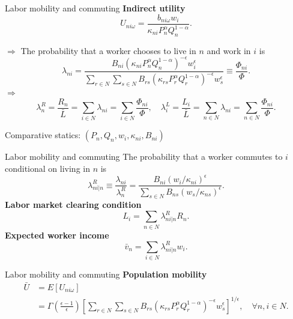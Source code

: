 \documentclass{beamer}
\begin{document}
\begin{frame}{Labor mobility and commuting}
	\textbf{Indirect utility}
	\begin{equation}
		U_{ni\omega} = \frac{b_{ni\omega}w_i}{\kappa_{ni}P_n^\alpha Q_n^{1-\alpha}}.
	\end{equation}
	\medskip

	$\Rightarrow$ The probability that a worker chooses to live in $n$ and work in $i$ is
	\begin{equation}
		\lambda_{ni} = \frac{B_{ni}\left(\kappa_{ni}P_n^\alpha Q_n^{1-\alpha}\right)^{-\epsilon}w_i^{\epsilon}}{\sum_{r\in N}\sum_{s\in N}B_{rs}\left(\kappa_{rs}P_r^\alpha Q_r^{1-\alpha}\right)^{-\epsilon}w_s^{\epsilon}}\equiv \frac{\Phi_{ni}}{\Phi}.
	\end{equation}
	$\Rightarrow$
	\begin{equation}
		\lambda_n^R = \frac{R_n}{\bar{L}}=\sum_{i\in N}\lambda_{ni}=\sum_{i\in N}\frac{\Phi_{ni}}{\Phi},\quad \lambda_i^L = \frac{L_i}{\bar{L}}=\sum_{n\in N}\lambda_{ni}=\sum_{n\in N}\frac{\Phi_{ni}}{\Phi}.
	\end{equation}
	\begin{block}{}
		Comparative statics: $(P_n, Q_n, w_i, \kappa_{ni}, B_{ni})$
	\end{block}
\end{frame}
\begin{frame}{Labor mobility and commuting}
	The probability that a worker commutes to $i$ conditional on living in $n$ is
	\begin{equation}
		\lambda_{ni|n}^R \equiv \frac{\lambda_{ni}}{\lambda_n^R} = \frac{B_{ni}(w_i/\kappa_{ni})^{\epsilon}}{\sum_{s\in N}B_{ns}(w_s/\kappa_{ns})^{\epsilon}}.
	\end{equation}
	\textbf{Labor market clearing condition}
	\begin{equation}
		L_i = \sum_{n\in N}\lambda_{ni|n}^R R_n.
	\end{equation}
	\textbf{Expected worker income}
	\begin{equation}
		\bar{v}_n = \sum_{i\in N}\lambda_{ni|n}^R w_i.
	\end{equation}
\end{frame}
\begin{frame}{Labor mobility and commuting}
	\textbf{Population mobility}
	\begin{equation}
		\begin{aligned}
			\bar{U} &= E\left[U_{ni\omega}\right] \\
			&= \Gamma\left(\frac{\epsilon-1}{\epsilon}\right)\left[ \sum_{r\in N}\sum_{s\in N}B_{rs}\left(\kappa_{rs}P_r^\alpha Q_r^{1-\alpha}\right)^{-\epsilon}w_s^\epsilon\right]^{1/\epsilon}, \quad \forall n,i \in N.
		\end{aligned}
	\end{equation}
\end{frame}
\end{document}
